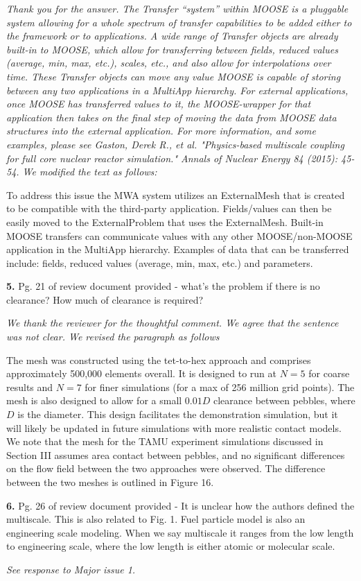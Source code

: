 \documentclass{nseJournal}
\begin{document}
\textit{Thank you for the answer. The Transfer “system” within MOOSE is a pluggable system allowing for a whole spectrum of transfer capabilities to be added either to the framework or to applications.  A wide range of Transfer objects are already built-in to MOOSE, which allow for transferring between fields, reduced values (average, min, max, etc.), scales, etc., and also allow for interpolations over time.  These Transfer objects can move any value MOOSE is capable of storing between any two applications in a MultiApp hierarchy.  For external applications, once MOOSE has transferred values to it, the MOOSE-wrapper for that application then takes on the final step of moving the data from MOOSE data structures into the external application.  For more information, and some examples, please see  Gaston, Derek R., et al. "Physics-based multiscale coupling for full core nuclear reactor simulation." Annals of Nuclear Energy 84 (2015): 45-54. We modified the text as follows:}

 To address this issue the MWA system utilizes an ExternalMesh that is created to be compatible with the third-party application. Fields/values can then be easily moved to the ExternalProblem  that uses the ExternalMesh. Built-in MOOSE transfers can communicate values with any other MOOSE/non-MOOSE application in the MultiApp hierarchy.  Examples of data that can be transferred include: fields, reduced values (average, min, max, etc.) and parameters.

\textbf{5.} Pg. 21 of review document provided - what's the problem if there is no clearance? How much of clearance is required?

\textit{We thank the reviewer for the thoughtful comment. We agree that the sentence was not clear. We revised the paragraph as follows}

The mesh was constructed using the tet-to-hex approach and comprises approximately 500,000 elements overall. It is designed to run at $N=5$ for coarse results and $N=7$ for finer simulations (for a max of 256 million grid points). The mesh is also designed to allow for a small $0.01D$ clearance between pebbles, where $D$ is the diameter. This design facilitates the demonstration simulation, but it will likely be updated in future simulations with more realistic contact models. We note that the mesh for the TAMU experiment simulations discussed in Section III assumes area contact between pebbles, and no significant differences on the flow field between the two approaches were observed. The difference between the two meshes is outlined in Figure 16.

\textbf{6.} Pg. 26 of review document provided - It is unclear how the authors defined the multiscale. This is also related to Fig. 1. Fuel particle model is also an engineering scale modeling. When we
say multiscale it ranges from the low length to engineering scale, where the low length is either atomic or molecular scale.

\textit{See response to Major issue 1.}

%

%
%
%

%
\end{document}
